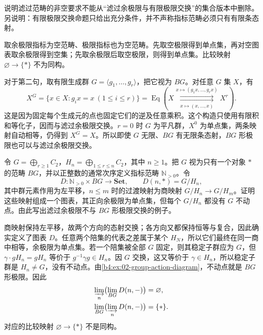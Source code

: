 \begin{exercise}\label{b4:ex:02-filtered-empty}
	说明滤过范畴的非空要求不能从“滤过余极限与有限极限交换”的集合版本中删除。另说明：有限极限交换命题只给出充分条件，并不声称指标范畴必须只有有限条态射。
\end{exercise}
\begin{solution}
	取余极限指标为空范畴、极限指标也为空范畴。先取空极限得到单点集，再对空图表取余极限得到空集；先取余极限后取空极限，则得到单点集。比较映射 \(\varnothing\rightarrow\{*\}\) 不为同构。

	对于第二句，取有限生成群 \(G=\langle g_1,\ldots,g_r\rangle\)，把它视为 \(BG\)。对任意 \(G\) 集 \(X\)，有
	\[
		X^G=\{x\in X:g_ix=x\ (1\le i\le r)\} =\operatorname{Eq}\!\left( X\underset{x\mapsto(x,\ldots,x)}{\overset{x\mapsto(g_1x,\ldots,g_rx)}{\rightrightarrows}}X^r \right).
	\]
	这是因为固定每个生成元的点也固定它们的逆及任意乘积。这个构造只使用有限积和等化子，因而与滤过余极限交换。\(r=0\) 时 \(G\) 为平凡群，\(X^0\) 为单点集，两条映射自动相等，仍得到 \(X^G=X\)。所以即使 \(G\) 无限、\(BG\) 有无限条态射，\(BG\) 形极限也可以与滤过余极限交换。
\end{solution}

\begin{exercise}\label{b4:ex:02-infinite-fixed-points}
	令 \(G=\bigoplus_{r\ge1}C_2\)，\(H_n=\bigoplus_{1\le r\le n}C_2\)，其中 \(n\ge1\)。把 \(G\) 视为只有一个对象 \(*\) 的范畴 \(BG\)，并以正整数的通常次序定义指标范畴 \(\mathbb N_{>0}\)。令
	\[
		D:\mathbb N_{>0}\times BG\longrightarrow\mathbf{Set}, \qquad D(n,*)=G/H_n,
	\]
	其中群元素作用为左平移，\(n\le m\) 时的过渡映射为商映射 \(G/H_n\rightarrow G/H_m\)。证明这些映射组成一个图表，其正向余极限为单点集，但每个 \(G/H_n\) 都没有 \(G\) 不动点。由此写出滤过余极限不与 \(BG\) 形极限交换的例子。
\end{exercise}
\begin{solution}
	商映射保持左平移，故两个方向的态射交换；各方向又都保持恒等与复合，因此确实定义了图表 \(D\)。任意两个陪集的代表之差属于某个 \(H_N\)，所以它们最终在同一商中相等，余极限为单点集。若一个陪集被全部 \(G\) 固定，则其稳定子群应为 \(G\)，但 \(\gamma\cdot gH_n=gH_n\) 等价于 \(g^{-1}\gamma g\in H_n\)。因 \(G\) 交换，这又等价于 \(\gamma\in H_n\)，所以稳定子群是 \(H_n\neq G\)，没有不动点。由\cref{b4:ex:02-group-action-diagram}，不动点就是 \(BG\) 形极限。因此
	\[
		\begin{aligned}
			\varinjlim_n\bigl(\lim_{BG}D(n,-)\bigr)&=\varnothing,\\
			\lim_{BG}\bigl(\varinjlim_nD(n,-)\bigr)&=\{*\}.
		\end{aligned}
	\]
	对应的比较映射 \(\varnothing\rightarrow\{*\}\) 不是同构。
\end{solution}

